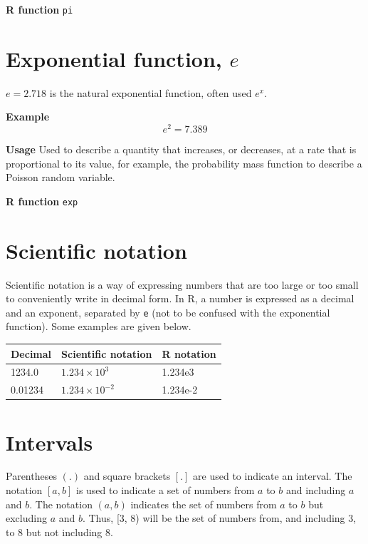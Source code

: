 \documentclass[
  oneside]{krantz}
\begin{document}
\textbf{R function} \texttt{pi}

\hypertarget{exponential-function-e}{%
\section{\texorpdfstring{Exponential function, \(e\)}{Exponential function, e}}\label{exponential-function-e}}

\(e = 2.718\) is the natural exponential function, often used \(e^x\).

\textbf{Example} \[e^2 = 7.389\]

\textbf{Usage} Used to describe a quantity that increases, or decreases, at a rate that is proportional to its value, for example, the probability mass function to describe a Poisson random variable.

\textbf{R function} \texttt{exp}

\hypertarget{scientific-notation}{%
\section{Scientific notation}\label{scientific-notation}}

Scientific notation is a way of expressing numbers that are too large or too small to conveniently write in decimal form. In R, a number is expressed as a decimal and an exponent, separated by \texttt{e} (not to be confused with the exponential function). Some examples are given below.

\begin{center}
\begin{tabular}{l|l|l}
Decimal & Scientific notation & R notation\\
\hline
1234.0 & $1.234 \times 10^3$ & 1.234e3\\
0.01234 & $1.234 \times 10^{-2}$ & \textrm{1.234e-2}\\
\end{tabular}
\end{center}

\hypertarget{intervals}{%
\section{Intervals}\label{intervals}}

Parentheses \((.)\) and square brackets \([.]\) are used to indicate an interval. The notation \([a, b]\) is used to indicate a set of numbers from \(a\) to \(b\) and including \(a\) and \(b\). The notation \((a, b)\) indicates the set of numbers from \(a\) to \(b\) but excluding \(a\) and \(b\). Thus, {[}3, 8) will be the set of numbers from, and including 3, to 8 but not including 8.
\end{document}
